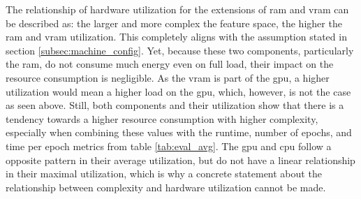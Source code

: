 The relationship of hardware utilization for the extensions of \gls{ram} and \gls{vram} can be described as: the larger and more complex the feature space, the higher the \gls{ram} and \gls{vram} utilization. This completely aligns with the assumption stated in section \ref{subsec:machine_config}. Yet, because these two components, particularly the \gls{ram}, do not consume much energy even on full load, their impact on the resource consumption is negligible. As the \gls{vram} is part of the \gls{gpu}, a higher utilization would mean a higher load on the \gls{gpu}, which, however, is not the case as seen above. Still, both components and their utilization show that there is a tendency towards a higher resource consumption with higher complexity, especially when combining these values with the runtime, number of epochs, and time per epoch metrics from table \ref{tab:eval_avg}. The \gls{gpu} and \gls{cpu} follow a opposite pattern in their average utilization, but do not have a linear relationship in their maximal utilization, which is why a concrete statement about the relationship between complexity and hardware utilization cannot be made.
